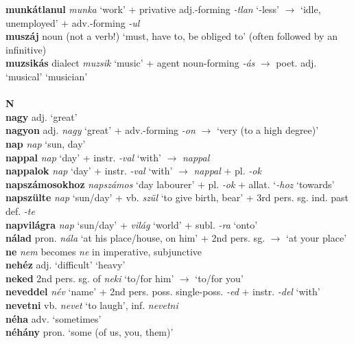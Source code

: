 \documentclass[11pt]{article}
\begin{document}
\textbf{munkátlanul} \emph{munka} `work' + privative
adj.\hyp{}forming \emph{-tlan} `-less' $\rightarrow$ `idle,
unemployed' + adv.\hyp{}forming \emph{-ul} \\
\textbf{muszáj} noun (not a verb!) `must, have to, be obliged to'
(often followed by an infinitive) \\
\textbf{muzsikás} dialect \emph{muzsik} `music' +  agent
noun\hyp{}forming \emph{-ás} $\rightarrow$
poet. adj. `musical' \textbar\textbar{} `musician' \\
\ \\
\noindent \textbf{\large N} \\
\textbf{nagy} adj. `great' \\
\textbf{nagyon} adj. \emph{nagy} `great' + adv.\hyp{}forming \emph{-on}
    $\rightarrow$ `very (to a high degree)' \\
\textbf{nap} \emph{nap} `sun, day' \\
\textbf{nappal} \emph{nap} `day' + instr. \emph{-val} `with'
$\rightarrow$ \emph{nappal} \\
\textbf{nappalok} \emph{nap} `day' + instr. \emph{-val}
  `with' $\rightarrow$ \emph{nappal} + pl. \emph{-ok} \\
\textbf{napszámosokhoz} \emph{napszámos} `day labourer' +
pl. \emph{-ok} + allat. `\emph{-hoz} `towards' \\
\textbf{napszülte} \emph{nap} `sun/day' + vb. \emph{szül} `to give
birth, bear' + 3rd pers. sg. ind. past def. \emph{-te} \\
\textbf{napvilágra} \emph{nap} `sun/day' + \emph{világ}
  `world' + subl. \emph{-ra} `onto' \\
\textbf{nálad} pron. \emph{nála} `at his place/house, on him' + 2nd
pers. sg. $\rightarrow$ `at your place' \\
\textbf{ne} \emph{nem} becomes \emph{ne} in imperative, subjunctive \\
\textbf{nehéz} adj. `difficult' \textbar\textbar{} `heavy' \\
\textbf{neked} 2nd pers. sg. of \emph{neki} `to/for him'
$\rightarrow$ `to/for you' \\
\textbf{neveddel} \emph{név} `name' + 2nd
pers. poss. single\hyp{}poss. \emph{-ed} + instr. \emph{-del}
`with' \\
\textbf{nevetni} vb. \emph{nevet} `to laugh', inf. \emph{nevetni} \\
\textbf{néha} adv. `sometimes' \\
\textbf{néhány} pron. `some (of us, you, them)' \\
\end{document}
